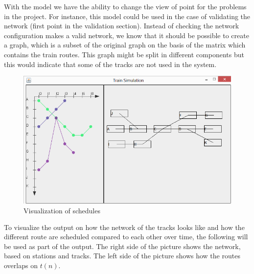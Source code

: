 \documentclass[10pt,a4paper]{article}
\begin{document}
With the model we have the ability to change the view of point for the problems in the project.
For instance, this model could be used in the case of validating the network (first point in the validation section). Instead of checking the network configuration makes a valid network, we know that it should be possible to create a graph, which is a subset of the original graph on the basis of the matrix which contains the train routes. This graph might be split in different components but this would indicate that some of the tracks are not used in the system.
\begin{figure}[h]
\centering
\includegraphics[scale=0.6]{fig/graphical_schedule.png}
 \caption{Visualization of schedules}
 \label{fig:graphical_schedule}
\end{figure}

To visualize the output on how the network of the tracks looks like and how the different route are scheduled compared to each other over time, the following will be used as part of the output. 
The right side of the picture shows the network, based on stations and tracks. The left side of the picture shows how the routes overlaps on $t\left(n\right)$.




\appendix



\nocite{Dijkstra:1979:PCH:1241515.1241516}
\nocite{Chapman:2006:CCM:1151816.1151820}
\nocite{bishop2004teaching}
\nocite{Wikipedia:Defensive_programming}
\nocite{Wikipedia:OO_encapsulation}
\end{document}
